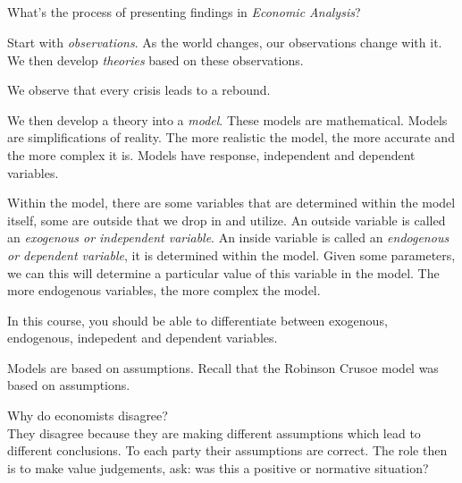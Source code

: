 \subsection{}

What's the process of presenting findings in \emph{Economic Analysis}?

Start with \emph{observations}.
As the world changes, our observations change with it.
We then develop \emph{theories} based on these observations.

\begin{example}
    We observe that every crisis leads to a rebound.
\end{example}

We then develop a theory into a \emph{model}. These models are mathematical.
Models are simplifications of reality.
The more realistic the model, the more accurate and the more complex it is.
Models have response, independent and dependent variables.

Within the model, there are some variables that are determined within the model itself, some are outside that we drop in and utilize.
An outside variable is called an \emph{exogenous or independent variable}. 
An inside variable is called an \emph{endogenous or dependent variable}, it is determined within the model. Given some parameters, we can this will determine a particular value of this variable in the model.
The more endogenous variables, the more complex the model.

In this course, you should be able to differentiate between exogenous, endogenous, indepedent and dependent variables.

Models are based on assumptions.
Recall that the Robinson Crusoe model was based on assumptions.

Why do economists disagree?\\
They disagree because they are making different assumptions which lead to different conclusions. To each party their assumptions are correct.
The role then is to make value judgements, ask: was this a positive or normative situation?

